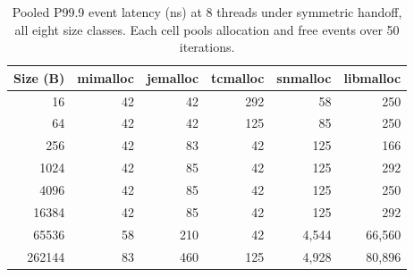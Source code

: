 \begin{table}[!htbp]
\centering
\footnotesize
\setlength{\tabcolsep}{3pt}
\caption{Pooled P99.9 event latency (ns) at 8 threads under symmetric handoff, all eight size classes. Each cell pools allocation and free events over 50 iterations.}
\label{tab:atlas-symmetric}
\begin{tabular}{rrrrrr}
\toprule
Size (B) & mimalloc & jemalloc & tcmalloc & snmalloc & libmalloc \\
\midrule
16 & 42 & 42 & 292 & 58 & 250 \\
64 & 42 & 42 & 125 & 85 & 250 \\
256 & 42 & 83 & 42 & 125 & 166 \\
1024 & 42 & 85 & 42 & 125 & 292 \\
4096 & 42 & 85 & 42 & 125 & 250 \\
16384 & 42 & 85 & 42 & 125 & 292 \\
65536 & 58 & 210 & 42 & 4{,}544 & 66{,}560 \\
262144 & 83 & 460 & 125 & 4{,}928 & 80{,}896 \\
\bottomrule
\end{tabular}
\end{table}
